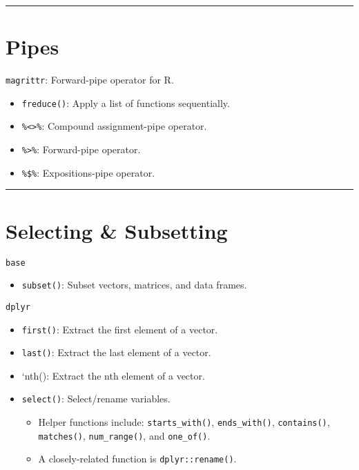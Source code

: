 \documentclass[]{book}
\providecommand{\tightlist}{%
  \setlength{\itemsep}{0pt}\setlength{\parskip}{0pt}}
\theoremstyle{definition}
\theoremstyle{definition}
\theoremstyle{definition}
\theoremstyle{remark}
\begin{document}
\begin{center}\rule{0.5\linewidth}{\linethickness}\end{center}

\section{Pipes}\label{pipes}

\texttt{magrittr}: Forward-pipe operator for R.

\begin{itemize}
\tightlist
\item
  \texttt{freduce()}: Apply a list of functions sequentially.
\item
  \texttt{\%\textless{}\textgreater{}\%}: Compound assignment-pipe
  operator.
\item
  \texttt{\%\textgreater{}\%}: Forward-pipe operator.
\item
  \texttt{\%\$\%}: Expositions-pipe operator.
\end{itemize}

\begin{center}\rule{0.5\linewidth}{\linethickness}\end{center}

\section{Selecting \& Subsetting}\label{selecting-subsetting}

\texttt{base}

\begin{itemize}
\tightlist
\item
  \texttt{subset()}: Subset vectors, matrices, and data frames.
\end{itemize}

\texttt{dplyr}

\begin{itemize}
\tightlist
\item
  \texttt{first()}: Extract the first element of a vector.
\item
  \texttt{last()}: Extract the last element of a vector.
\item
  `nth(): Extract the nth element of a vector.
\item
  \texttt{select()}: Select/rename variables.

  \begin{itemize}
  \tightlist
  \item
    Helper functions include: \texttt{starts\_with()},
    \texttt{ends\_with()}, \texttt{contains()}, \texttt{matches()},
    \texttt{num\_range()}, and \texttt{one\_of()}.
  \item
    A closely-related function is \texttt{dplyr::rename()}.
  \end{itemize}
\end{itemize}
\end{document}
